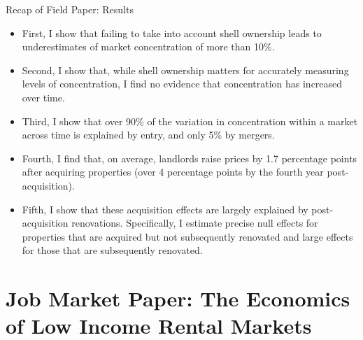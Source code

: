 \documentclass[10pt, xcolor=dvipsnames]{beamer}
\begin{document}
\begin{frame}{Recap of Field Paper: Results}
    \begin{itemize}
    \item First, I show that failing to take into account shell ownership leads to underestimates of market concentration of more than 10\%.
    \pause
    \item Second, I show that, while shell ownership matters for accurately measuring levels of concentration, I find no evidence that concentration has increased over time.
    \pause
    \item Third, I show that over 90\% of the variation in concentration within a market across time is explained by entry, and only 5\% by mergers.
    \pause
    \item Fourth, I find that, on average, landlords raise prices by 1.7 percentage points after acquiring properties (over 4 percentage points by the fourth year post-acquisition).
    \pause
    \item Fifth, I show that these acquisition effects are largely explained by post-acquisition renovations. Specifically, I estimate precise null effects for properties that are acquired but not subsequently renovated and large effects for those that are subsequently renovated.
  \end{itemize}
    
\end{frame}

\section{Job Market Paper: The Economics of Low Income Rental Markets}
\end{document}
